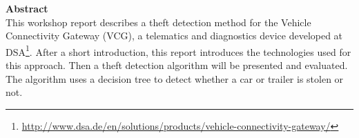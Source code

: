 \vspace*{2cm}
\vspace{10ex}
{\bf\Large Abstract} \\ [1em]

This workshop report describes a theft detection method for the Vehicle Connectivity Gateway (VCG), a telematics and diagnostics device developed at DSA\footnote{\url{http://www.dsa.de/en/solutions/products/vehicle-connectivity-gateway/}}. After a short introduction, this report introduces the technologies used for this approach. Then a theft detection algorithm will be presented and evaluated. The algorithm uses a decision tree to detect whether a car or trailer is stolen or not. 

\cleardoublepage
